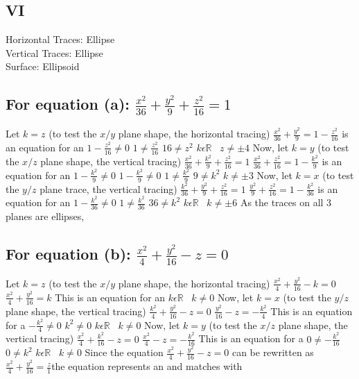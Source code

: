 \documentclass{article}
\begin{document}
\subsection*{VI}
Horizontal Traces: Ellipse \\Vertical Traces: Ellipse \\Surface: Ellipsoid\\[1in]
\begin{multicols*}{2}
    \subsection{For equation (a): $ \frac{x^2}{36}+\frac{y^2}{9}+\frac{z^2}{16}=1$}
Let $k=z$ (to test the $x/y$ plane shape, the horizontal tracing)
\vfill$ \frac{x^2}{36}+\frac{y^2}{9}=1-\frac{z^2}{16}$ is an equation for an 
\vfill$ 1-\frac{z^2}{16}\neq0$
\vfill$ 1 \neq \frac{z^2}{16}$
\vfill$ 16 \neq z^2$
\vfill$ k \epsilon \mathbb{R} \;\;\; z \neq \pm 4$
\vfill Now, let $k=y$ (to test the $x/z$ plane shape, the vertical tracing)
\vfill$ \frac{x^2}{36}+\frac{k^2}{9}+\frac{z^2}{16}=1$
\vfill$ \frac{x^2}{36}+\frac{z^2}{16}=1-\frac{k^2}{9}$ is an equation for an 
\vfill$ 1-\frac{k^2}{9} \neq 0$
\vfill$ 1-\frac{k^2}{9} \neq 0$
\vfill$ 1\neq \frac{k^2}{9}$
\vfill$ 9 \neq k^2$
\vfill$ k \neq \pm 3$
\vfill Now, let $k=x$ (to test the $y/z$ plane trace, the vertical tracing)
\vfill$ \frac{k^2}{36}+\frac{y^2}{9}+\frac{z^2}{16}=1$
\vfill$ \frac{y^2}{9}+\frac{z^2}{16}=1-\frac{k^2}{36}$ is an equation for an 
\vfill$ 1-\frac{k^2}{36}\neq 0$
\vfill$ 1 \neq \frac{k^2}{36}$
\vfill$ 36 \neq k^2$
\vfill$ k \epsilon \mathbb{R} \;\;\; k \neq \pm 6$
\vfill As the traces on all 3 planes are ellipses, \\[1in]
\vfill\null
\columnbreak
\subsection*{For equation (b): $ \frac{x^2}{4}+\frac{y^2}{16}-z=0$}
Let $k=z$ (to test the $x/y$ plane shape, the horizontal tracing)
\vfill$ \frac{x^2}{4}+\frac{y^2}{16}-k=0$
\vfill$ \frac{x^2}{4}+\frac{y^2}{16}=k$ This is an equation for an 
\vfill$ k \epsilon \mathbb{R} \;\;\; k \neq 0$
\vfill Now, let $k=x$ (to test the $y/z$ plane shape, the vertical tracing)
\vfill$ \frac{k^2}{4}+\frac{y^2}{16}-z=0$
\vfill$ \frac{y^2}{16}-z=-\frac{k^2}{4}$ This is an equation for a 
\vfill$-\frac{k^2}{4} \neq 0$
\vfill${k^2} \neq 0$
\vfill$k \epsilon \mathbb{R} \;\;\;k \neq 0$
\vfill Now, let $k=y$ (to test the $x/z$ plane shape, the vertical tracing) 
\vfill $ \frac{x^2}{4}+\frac{k^2}{16}-z=0$
\vfill$ \frac{x^2}{4}-z=-\frac{k^2}{16}$ This is an equation for a 
\vfill$ 0 \neq -\frac{k^2}{16}$
\vfill$ 0 \neq k^2$
\vfill$ k \epsilon \mathbb{R} \;\;\; k \neq 0$
\vfill Since the equation $ \frac{x^2}{4}+\frac{y^2}{16}-z=0$ can be rewritten as $ \frac{x^2}{4}+\frac{y^2}{16}=\frac{z}{1}$the equation represents an  and matches with \\[2in]
\end{multicols*}
\end{document}
